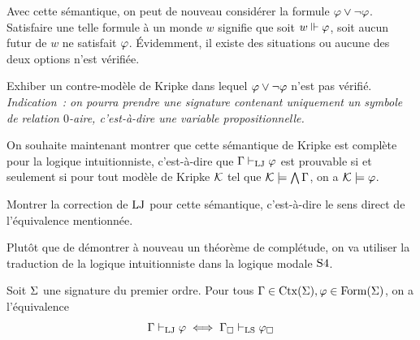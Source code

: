 Avec cette sémantique, on peut de nouveau considérer la formule
$\varphi\lor\lnot\varphi$. Satisfaire une telle formule à un monde $w$
signifie que soit $w\Vdash\varphi$, soit aucun futur de $w$ ne satisfait
$\varphi$. \'Evidemment, il existe des situations ou aucune des deux options
n'est vérifiée.

\begin{exercise}
  Exhiber un contre-modèle de Kripke dans lequel $\varphi\lor\lnot\varphi$
  n'est pas vérifié. \textit{Indication~: on pourra prendre une signature
    contenant uniquement un symbole de relation $0$-aire, c'est-à-dire une
    variable propositionnelle.}
\end{exercise}

On souhaite maintenant montrer que cette sémantique de Kripke est complète
pour la logique intuitionniste, c'est-à-dire que $\Gamma\vdash_{\operatorname{LJ}}\varphi$ est
prouvable si et seulement si pour tout modèle de Kripke $\mathcal{K}$ tel que
$\mathcal{K}\models\bigwedge\Gamma$, on a $\mathcal{K}\models\varphi$.

\begin{exercise}
  Montrer la correction de $\operatorname{LJ}$ pour cette sémantique, c'est-à-dire le sens
  direct de l'équivalence mentionnée.
\end{exercise}

Plutôt que de démontrer à nouveau un théorème de complétude, on va utiliser la
traduction de la logique intuitionniste dans la logique modale $\mathrm{S}4$.

\begin{theorem}
  Soit $\Sigma$ une signature du premier ordre.
  Pour tous $\Gamma\in\operatorname{Ctx}(\Sigma), \varphi\in\operatorname{Form}(\Sigma)$,
  on a l'équivalence
  \[\Gamma\vdash_{\operatorname{LJ}}\varphi \iff \Gamma_{\mathbin{\square}}\vdash_{\operatorname{LS}}\varphi_{\mathbin{\square}}\]
\end{theorem}

